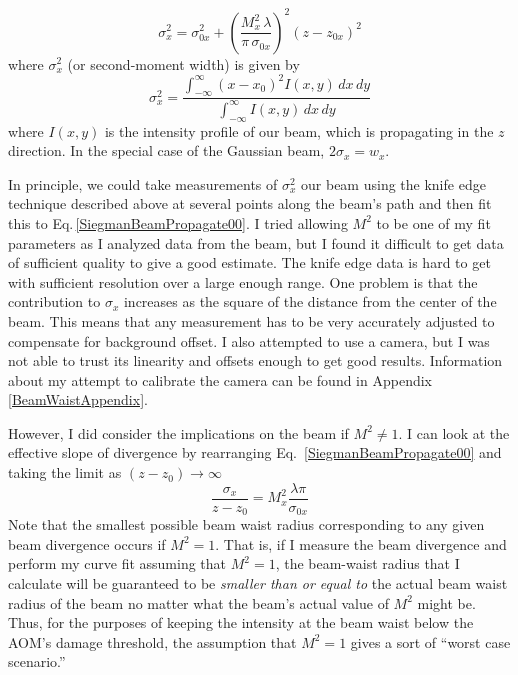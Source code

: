 \begin{equation}
\sigma_x^2=\sigma_{0x}^2+\left( \frac{M_x^2 \,\lambda}{\pi \, \sigma_{0x}}\right)^2 (z-z_{0x})^2 \label{SiegmanBeamPropagate00}
\end{equation}
where $\sigma_x^2$ (or second-moment width) is given by 
\begin{equation}\label{secondMomentWidth}
\sigma_x^2=\frac{\int_{-\infty}^{\infty} (x-x_0)^2 I(x,y)\, dx\, dy}{\int_{-\infty}^{\infty} I(x,y)\, dx \, dy}
\end{equation} 
where $I(x,y)$ is the intensity profile of our beam, which is propagating in the $z$ direction. In the special case of the Gaussian beam, $2\sigma_x=w_x$.

In principle, we could take measurements of $\sigma_x^2$ our beam using the knife edge technique described above at several points along the beam's path and then fit this to Eq.\,\ref{SiegmanBeamPropagate00}.
I tried allowing $M^2$ to be one of my fit parameters as I analyzed data from the beam, but I found it difficult to get data of sufficient quality to give a good estimate. The knife edge data is hard to get with sufficient resolution over a large enough range. One problem is that the contribution to $\sigma_x$ increases as the square of the distance from the center of the beam. This means that any measurement has to be very accurately adjusted to compensate for background offset. I also attempted to use a camera, but I was not able to trust its linearity and offsets enough to get good results. Information about my attempt to calibrate the camera can be found in Appendix\,\ref{BeamWaistAppendix}. 

However, I did consider the implications on the beam if $M^2\neq 1$. I can look at the effective slope of divergence by rearranging Eq.\ \ref{SiegmanBeamPropagate00} and taking the limit as $(z-z_0) \rightarrow \infty$
\begin{equation}
\frac{\sigma_x}{z-z_0}=M_x^2 \frac{\lambda \pi}{\sigma_{0x}} \label{SiegmanBeamSlope}
\end{equation}
Note that the smallest possible beam waist radius corresponding to any given beam divergence occurs if $M^2=1$. That is, if I measure the beam divergence and perform my curve fit assuming that $M^2=1$, the beam-waist radius that I calculate will be guaranteed to be \emph{smaller than or equal to} the actual beam waist radius of the beam no matter what the beam's actual value of $M^2$ might be. Thus, for the purposes of keeping the intensity at the beam waist below the AOM's damage threshold, the assumption that $M^2=1$ gives a sort of ``worst case scenario.'' 

